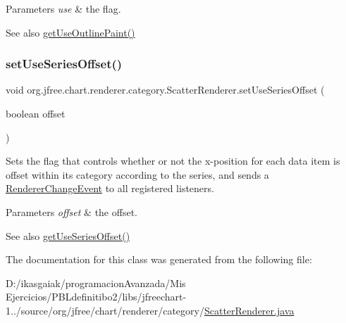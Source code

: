 \begin{DoxyParams}{Parameters}
{\em use} & the flag.\\
\hline
\end{DoxyParams}
\begin{DoxySeeAlso}{See also}
\mbox{\hyperlink{classorg_1_1jfree_1_1chart_1_1renderer_1_1category_1_1_scatter_renderer_a4aab32236d2b3e1ffc9e3165a2789500}{get\+Use\+Outline\+Paint()}} 
\end{DoxySeeAlso}
\mbox{\label{classorg_1_1jfree_1_1chart_1_1renderer_1_1category_1_1_scatter_renderer_a0a2e10126057a8828d7c9e86270f2fbb}} 
\subsubsection{\texorpdfstring{set\+Use\+Series\+Offset()}{setUseSeriesOffset()}}
{\footnotesize\ttfamily void org.\+jfree.\+chart.\+renderer.\+category.\+Scatter\+Renderer.\+set\+Use\+Series\+Offset (\begin{DoxyParamCaption}\item[{boolean}]{offset }\end{DoxyParamCaption})}

Sets the flag that controls whether or not the x-\/position for each data item is offset within its category according to the series, and sends a \mbox{\hyperlink{}{Renderer\+Change\+Event}} to all registered listeners.


\begin{DoxyParams}{Parameters}
{\em offset} & the offset.\\
\hline
\end{DoxyParams}
\begin{DoxySeeAlso}{See also}
\mbox{\hyperlink{classorg_1_1jfree_1_1chart_1_1renderer_1_1category_1_1_scatter_renderer_a7ec61a84fcdf7910f9459b2e88261249}{get\+Use\+Series\+Offset()}} 
\end{DoxySeeAlso}


The documentation for this class was generated from the following file\+:\begin{DoxyCompactItemize}
\item 
D\+:/ikasgaiak/programacion\+Avanzada/\+Mis Ejercicios/\+P\+B\+Ldefinitibo2/libs/jfreechart-\/1../source/org/jfree/chart/renderer/category/\mbox{\hyperlink{_scatter_renderer_8java}{Scatter\+Renderer.\+java}}\end{DoxyCompactItemize}
